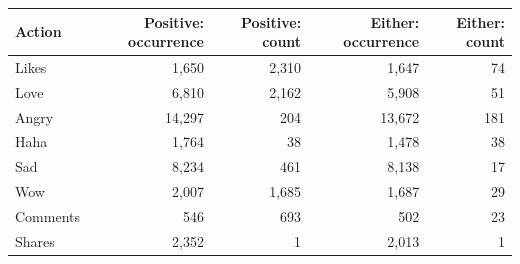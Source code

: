 \begin{tabular}{lrrrr}
\toprule
Action & Positive: occurrence & Positive: count & Either: occurrence & Either: count \\
\midrule
Likes & 1,650 & 2,310 & 1,647 & 74 \\
Love & 6,810 & 2,162 & 5,908 & 51 \\
Angry & 14,297 & 204 & 13,672 & 181 \\
Haha & 1,764 & 38 & 1,478 & 38 \\
Sad & 8,234 & 461 & 8,138 & 17 \\
Wow & 2,007 & 1,685 & 1,687 & 29 \\
Comments & 546 & 693 & 502 & 23 \\
Shares & 2,352 & 1 & 2,013 & 1 \\
\bottomrule
\end{tabular}
